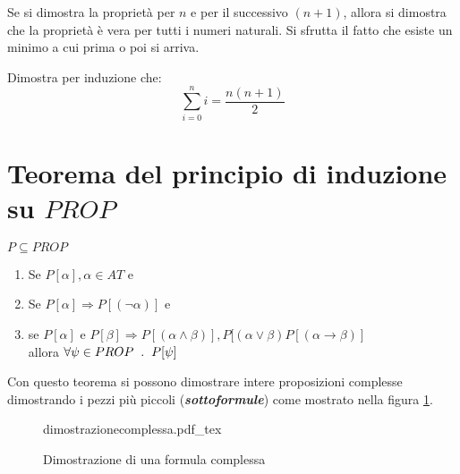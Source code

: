\documentclass{article}
\newcommand{\incfig}[2][1]{%
	\def\svgwidth{#1\columnwidth}
	{#2.pdf_tex}
}
\theoremstyle{break}
\theoremstyle{break}
\theoremstyle{break}
\theoremstyle{break}
\begin{document}
Se si dimostra la proprietà per \( n \) e per il successivo \( (n+1) \), allora
si dimostra che la proprietà è vera per tutti i numeri naturali. Si sfrutta
il fatto che esiste un minimo a cui prima o poi si arriva.
\begin{exercise}
	Dimostra per induzione che:
	\[\sum_{i=0}^{n} i = \frac{n(n+1)}{2}\]

\end{exercise}
\section{Teorema del principio di induzione su \( PROP \)}
\begin{definition}
	\( P \subseteq PROP \)
	\begin{enumerate}
		\item Se \( P[\alpha ], \alpha \in AT \) e
		\item Se \( P[\alpha ] \Rightarrow P[(\neg \alpha )] \) e
		\item se \( P[\alpha ]\) e \(P[\beta ] \Rightarrow P[(\alpha \wedge \beta )],
		      P[(\alpha \vee \beta) P[(\alpha \to \beta )]\)\\
		      allora \( \forall \psi \in PROP \hspace{2mm} . \hspace{2mm} P[\psi]\)
	\end{enumerate}
\end{definition}

Con questo teorema si possono dimostrare intere proposizioni complesse dimostrando i pezzi
più piccoli (\textbf{\emph{sottoformule}}) come mostrato nella figura \ref{fig:dimostrazionecomplessa}.

\label{ex:dimostrazioneComplessa}
\begin{figure}[h]
	\centering
	\incfig[1]{dimostrazionecomplessa}
	\caption{Dimostrazione di una formula complessa}
	\label{fig:dimostrazionecomplessa}
\end{figure}

\pagebreak
\end{document}
